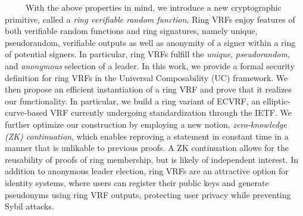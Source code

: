 ~~~~~With the above properties in mind, we introduce a new cryptographic primitive, called a 
\emph{ring verifiable random function.}
Ring VRFs enjoy features of both verifiable random functions and ring signatures, namely unique, pseudorandom, verifiable outputs as well as anonymity of a signer within a ring of potential signers.
In particular, ring VRFs fulfill the \emph{unique}, \emph{pseudorandom}, and \emph{anonymous} selection of a leader.
In this work, we provide a formal security definition for ring VRFs in the Universal Composability (UC) framework.
We then propose an efficient instantiation of a ring VRF and prove that it realizes our functionality.
In particular, we build a ring variant of ECVRF, an elliptic-curve-based VRF currently undergoing standardization through the IETF.
We further optimize our construction by employing a new notion, \emph{zero-knowledge (ZK) continuation}, which enables reproving a statement in constant time in a manner that is unlikable to previous proofs.
A ZK continuation allows for the reusability of proofs of ring membership, but is likely of independent interest.
In addition to anonymous leader election, ring VRFs are an attractive option for identity systems, where users can register their public keys and generate pseudonyms using ring VRF outputs, protecting user privacy while preventing Sybil attacks.


